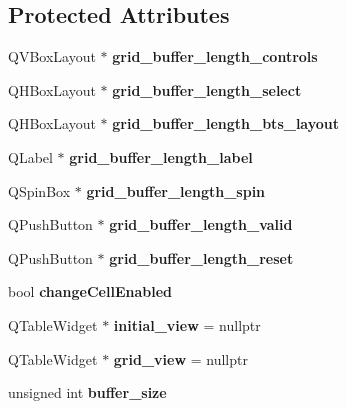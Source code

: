\subsection*{Protected Attributes}
\begin{DoxyCompactItemize}
\item 
\mbox{\label{class_interface1_d_a94fcd4a2c4fc2af984388ddb39685979}} 
Q\+V\+Box\+Layout $\ast$ {\bfseries grid\+\_\+buffer\+\_\+length\+\_\+controls}
\item 
\mbox{\label{class_interface1_d_a4f37ee00aa2dbe531c80a0c25974f4c3}} 
Q\+H\+Box\+Layout $\ast$ {\bfseries grid\+\_\+buffer\+\_\+length\+\_\+select}
\item 
\mbox{\label{class_interface1_d_aaf04992c3409e657053f3e1d0cb0f953}} 
Q\+H\+Box\+Layout $\ast$ {\bfseries grid\+\_\+buffer\+\_\+length\+\_\+bts\+\_\+layout}
\item 
\mbox{\label{class_interface1_d_adde16cc46be8553a0398043524ced7d2}} 
Q\+Label $\ast$ {\bfseries grid\+\_\+buffer\+\_\+length\+\_\+label}
\item 
\mbox{\label{class_interface1_d_a8cc808b00bc37e73b14c3e4067e8df21}} 
Q\+Spin\+Box $\ast$ {\bfseries grid\+\_\+buffer\+\_\+length\+\_\+spin}
\item 
\mbox{\label{class_interface1_d_aa5933ea7eaa0d542227a0ac2c86ec86d}} 
Q\+Push\+Button $\ast$ {\bfseries grid\+\_\+buffer\+\_\+length\+\_\+valid}
\item 
\mbox{\label{class_interface1_d_ae81745200d277ea2526fb168a4663bf2}} 
Q\+Push\+Button $\ast$ {\bfseries grid\+\_\+buffer\+\_\+length\+\_\+reset}
\item 
\mbox{\label{class_interface1_d_ac16b734a2603de2797d683496c00aacf}} 
bool {\bfseries change\+Cell\+Enabled}
\item 
\mbox{\label{class_interface1_d_a7dce37e12e11b953432797de8ed7bd3d}} 
Q\+Table\+Widget $\ast$ {\bfseries initial\+\_\+view} = nullptr
\item 
\mbox{\label{class_interface1_d_a7cf579567eaba4a567e70aa3681fc46c}} 
Q\+Table\+Widget $\ast$ {\bfseries grid\+\_\+view} = nullptr
\item 
\mbox{\label{class_interface1_d_a0dbe452783da185442c185d315e02019}} 
unsigned int {\bfseries buffer\+\_\+size}
\end{DoxyCompactItemize}
